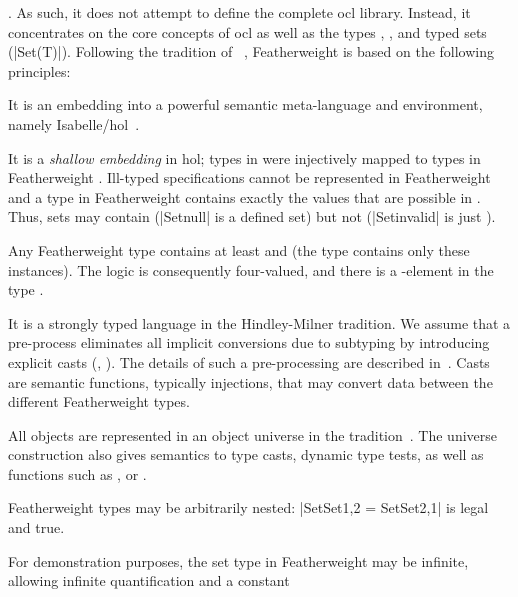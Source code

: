 . As such, it does not attempt to define the complete
\acs{ocl} library. Instead, it concentrates on the core concepts of
\acs{ocl} as well as the types ,
, and typed sets (\inlineocl|Set(T)|).  Following
the tradition of
\holocl~\cite{brucker.ea:hol-ocl:2008,brucker.ea:hol-ocl-book:2006},
Featherweight \OCL is based on the following principles:
\begin{compactenum}
\item It is an embedding into a powerful semantic meta-language and
  environment, namely
  Isabelle/\acs{hol}~\cite{nipkow.ea:isabelle:2002}.
\item It is a \emph{shallow embedding} in \acs{hol}; types
  in \OCL were injectively mapped to types in Featherweight
  \OCL. Ill-typed \OCL specifications cannot be represented in
  Featherweight \OCL and a type in Featherweight \OCL contains exactly
  the values that are possible in \OCL. Thus, sets may contain
   (\inlineocl|Set{null}| is a defined set) but not
   (\inlineocl|Set{invalid}| is just
  ).
\item Any Featherweight \OCL type contains at least
   and  (the type 
  contains only these instances). The logic is consequently
  four-valued, and there is a -element in the type
  .
\item It is a strongly typed language in the Hindley-Milner tradition.
  We assume that a pre-process eliminates all implicit conversions due
  to subtyping by introducing explicit casts (\eg,
  ). The details of such a pre-processing are
  described in~\cite{brucker:interactive:2007}.  Casts are semantic
  functions, typically injections, that may convert data between the
  different Featherweight \OCL types.
\item All objects are represented in an object universe in the \holocl
  tradition~\cite{brucker.ea:extensible:2008-b}. The universe
  construction also gives semantics to type casts, dynamic type
  tests, as well as functions such as ,
  or .
\item Featherweight \OCL types may be arbitrarily nested:
  \inlineocl|Set{Set{1,2}} = Set{Set{2,1}}| is legal and true.
\item For demonstration purposes, the set type in Featherweight \OCL
  may be infinite, allowing infinite quantification and a constant

\end{compactenum}

